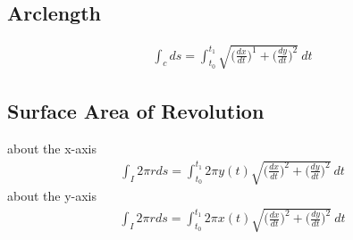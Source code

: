 \documentclass{article}
\theoremstyle{mytheoremstyle}
\theoremstyle{mytheoremstyle}
\theoremstyle{myproblemstyle}
\begin{document}
    \subsection*{Arclength}
    \begin{align*}
        \int_c ds = \int_{t_0}^{t_1} \sqrt{\Big(\frac{dx}{dt}\Big)^1 + \Big(\frac{dy}{dt}\Big)^2} \ dt
    \end{align*}

    \subsection*{Surface Area of Revolution}
    about the x-axis
    \begin{align*}
        \int_I 2\pi r ds = \int_{t_0}^{t_1} 2\pi y(t) \sqrt{\Big(\frac{dx}{dt}\Big)^2 + \Big(\frac{dy}{dt}\Big)^2} \ dt
    \end{align*}
    about the y-axis
    \begin{align*}
        \int_I 2\pi r ds = \int_{t_0}^{t_1} 2\pi x(t) \sqrt{\Big(\frac{dx}{dt}\Big)^2 + \Big(\frac{dy}{dt}\Big)^2} \ dt
    \end{align*}
\end{document}
